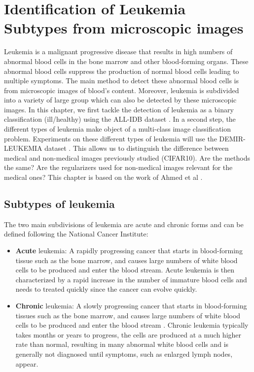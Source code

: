 \documentclass[11pt, openany]{report}
\theoremstyle{plain}
\theoremstyle{definition}
\theoremstyle{remark}
\begin{document}
\chapter{Identification of Leukemia Subtypes from microscopic images}

Leukemia is a malignant progressive disease that results in high numbers of abnormal blood cells in the bone marrow and other blood-forming organs. These abnormal blood cells suppress the production of normal blood cells leading to multiple symptoms. The main method to detect these abnormal blood cells is from microscopic images of blood's content. Moreover, leukemia is subdivided into a variety of large group which can also be detected by these microscopic images. In this chapter, we first tackle the detection of leukemia as a binary classification (ill/healthy) using the ALL-IDB dataset \cite{ALL-IDB}. In a second step, the different types of leukemia make object of a multi-class image classification problem. Experiments on these different types of leukemia will use the DEMIR-LEUKEMIA dataset \cite{leukemia}. This allows us to distinguish the difference between medical and non-medical images previously studied (CIFAR10). Are the methods the same? Are the regularizers used for non-medical images relevant for the medical ones? This chapter is based on the work of Ahmed et al \cite{leukemia}. 


\section{Subtypes of leukemia}
The two main subdivisions of leukemia are acute and chronic forms and can be defined following the National Cancer Institute: 
\begin{itemize}
\item \textbf{Acute} leukemia: A rapidly progressing cancer that starts in blood-forming tissue such as the bone marrow, and causes large numbers of white blood cells to be produced and enter the blood stream\cite{NCI}. Acute leukemia is then characterized by a rapid increase in the number of immature blood cells and needs to treated quickly since the cancer can evolve quickly. 
\item \textbf{Chronic} leukemia: A slowly progressing cancer that starts in blood-forming tissues such as the bone marrow, and causes large numbers of white blood cells to be produced and enter the blood stream \cite{NCI}. Chronic leukemia typically takes months or years to progress, the cells are produced at a much higher rate than normal, resulting in many abnormal white blood cells and is generally not diagnosed until symptoms, such as enlarged lymph nodes, appear.
\end{itemize} 
\end{document}
